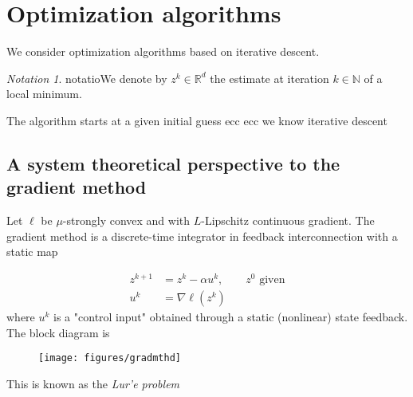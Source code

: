 \documentclass{book}
\newcommand{\R}{\mathbb{R}}
\newcommand{\N}{\mathbb{N}}
\theoremstyle{theoremv2}
\theoremstyle{defv2}
\theoremstyle{remark}
\theoremstyle{remark}
\newtheorem*{notation}{Notation}
\theoremstyle{definition}
\theoremstyle{definition}
\begin{document}
\section{Optimization algorithms}
We consider optimization algorithms based on iterative descent.
\begin{notation}
    notatioWe denote by $z^k\in\R^d$ the estimate at iteration $k\in\N$ of a local minimum. 
\end{notation}
The algorithm starts at a given initial guess ecc ecc we know iterative descent
\subsection{A system theoretical perspective to the gradient method}
Let $\ell$ be $\mu$-strongly convex and with $L$-Lipschitz continuous gradient. The gradient method is a discrete-time integrator in feedback interconnection with a static map

\begin{align*}
    z^{k+1} &= z^k-\alpha u^k, \qquad  z^0 \text{ given}\\ 
    u^k &= \nabla \ell(z^k)
\end{align*}
where $u^k$ is a "control input" obtained through a static (nonlinear) state feedback. The block diagram is 
\begin{figure}[h]
    \center
    \texttt{[image: figures/gradmthd]}
\end{figure}


This is known as the \emph{Lur'e problem}
\end{document}

